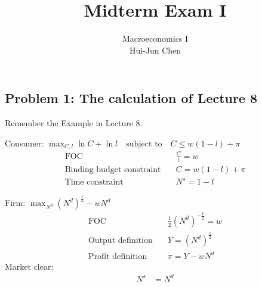 \documentclass[14pt]{extarticle}
\title{Midterm Exam I}
\author{Macroeconomics I \\ Hui-Jun Chen}
\newcommand{\red}[1]{\textcolor{red}{#1}}
\newcommand{\showAns}{\setboolean{showAns}{true}}
\begin{document}
\maketitle





\begin{Exercise}

\section*{Problem 1: The calculation of Lecture 8}

Remember the Example in Lecture 8.

    Consumer: $ \max_{C, l} \ln C + \ln l \quad \text{subject to} \quad C \le w( 1-l ) + \pi $
    \begin{align}
        \text{FOC} \quad
            & \frac{C}{l} = w
            \label{eq:consumerFOC}
        \\
        \text{Binding budget constraint} \quad
            & C = w ( 1-l ) + \pi
            \label{eq:binding_budget}
        \\
        \text{Time constraint} \quad
            & N^{s} = 1 - l
            \label{eq:time_budget}
    \end{align}

    Firm: $ \max_{N^{d}} ( N^{d} )^{\frac{1}{2}} - w N^{d} $
    \begin{align}
        \text{FOC} \quad
            & \frac{1}{2} ( N^{d} )^{- \frac{1}{2}} = w
            \label{eq:firmFOC}
        \\
        \text{Output definition} \quad
            & Y = ( N^{d} )^{\frac{1}{2}}
            \label{eq:outputDef}
        \\
        \text{Profit definition} \quad
            & \pi = Y - w N^{d}
            \label{eq:profitDef}
    \end{align}
    Market clear:
    \begin{align}
        N^{s} & = N^{d}
        \label{eq:laborClear}
    \end{align}


\end{Exercise}
\end{document}

